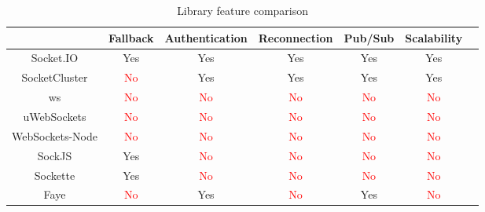 \begin{table}[h]
  \centering
  \begin{tabular}{|c|c|c|c|c|c|c|}
    \hline
                    & Fallback            & Authentication      & Reconnection        & Pub/Sub             & Scalability         \\ \hline
    Socket.IO       & Yes                 & Yes                 & Yes                 & Yes                 & Yes                 \\ \hline
    SocketCluster   & \textcolor{red}{No} & Yes                 & Yes                 & Yes                 & Yes                 \\ \hline
    ws              & \textcolor{red}{No} & \textcolor{red}{No} & \textcolor{red}{No} & \textcolor{red}{No} & \textcolor{red}{No} \\ \hline
    uWebSockets     & \textcolor{red}{No} & \textcolor{red}{No} & \textcolor{red}{No} & \textcolor{red}{No} & \textcolor{red}{No} \\ \hline
    WebSockets-Node & \textcolor{red}{No} & \textcolor{red}{No} & \textcolor{red}{No} & \textcolor{red}{No} & \textcolor{red}{No} \\ \hline
    SockJS          & Yes                 & \textcolor{red}{No} & \textcolor{red}{No} & \textcolor{red}{No} & \textcolor{red}{No} \\ \hline
    Sockette        & Yes                 & \textcolor{red}{No} & \textcolor{red}{No} & \textcolor{red}{No} & \textcolor{red}{No} \\ \hline
    Faye            & \textcolor{red}{No} & Yes                 & \textcolor{red}{No} & Yes                 & \textcolor{red}{No} \\ \hline
  \end{tabular}
  \caption{Library feature comparison}
\end{table}

